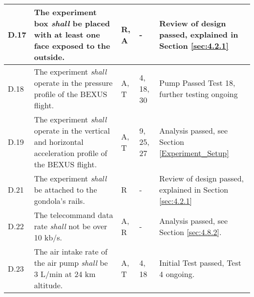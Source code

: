 \begin{longtable}[]{|m{}| m{} |m{} |m{}|m{}|}
D.17 & The experiment box \textit{shall} be placed with at least one face exposed to the outside.                                                                                &     R, A         & -            &   Review of design passed, explained in Section \ref{sec:4.2.1}     
\\ \hline
D.18 & The  experiment \textit{shall} operate  in  the  pressure  profile  of  the BEXUS flight.\cite{BexusManual}                                                                              &    A, T         & 4, 18, 30 &  Pump Passed Test 18, further testing ongoing     
\\ \hline
D.19 & The  experiment \textit{shall} operate  in  the  vertical  and  horizontal  acceleration  profile  of  the BEXUS flight.\cite{BexusManual}                                                                              &    A, T         & 9, 25, 27            &   Analysis passed, see Section \ref{Experiment_Setup}    
\\ \hline
D.21 & The experiment \textit{shall} be attached to the gondola’s rails.                                                                                &     R         & -            &  Review of design passed, explained in Section \ref{sec:4.2.1}     
\\ \hline
D.22 & The telecommand data rate \textit{shall} not be over 10 kb/s.                                                                               &     A, R         & -            &    Analysis passed, see Section \ref{sec:4.8.2}.   
\\  \hline

D.23 & The air intake rate of the air pump \textit{shall} be 3 L/min at 24 km altitude.                                                                                                                        &       A, T        & 4, 18            &  Initial Test passed, Test 4 ongoing.      \\ \hline


\end{longtable}
